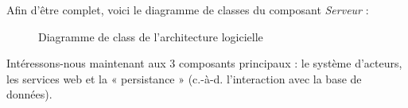 Afin d’être complet, voici le diagramme de classes du composant \emph{Serveur} :
\begin{figure}[H]
    \begin{center}

        \caption{Diagramme de class de l'architecture logicielle}
    \end{center}
\end{figure}

Intéressons-nous maintenant aux 3 composants principaux : le système d’acteurs, les services web et la « persistance » (c.-à-d. l’interaction avec la base de données).



